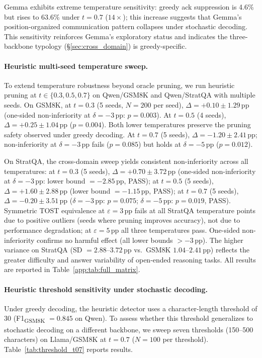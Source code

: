 Gemma exhibits extreme temperature sensitivity: greedy ack suppression is 4.6\% but rises to 63.6\% under $t{=}0.7$ ($14\times$); this increase suggests that Gemma's position-organized communication pattern collapses under stochastic decoding. This sensitivity reinforces Gemma's exploratory status and indicates the three-backbone typology (\S\ref{sec:cross_domain}) is greedy-specific.

\paragraph{Heuristic multi-seed temperature sweep.}
To extend temperature robustness beyond oracle pruning, we run heuristic pruning at $t \in \{0.3, 0.5, 0.7\}$ on Qwen/GSM8K and Qwen/StratQA with multiple seeds. On GSM8K, at $t{=}0.3$ (5 seeds, $N{=}200$ per seed), $\Delta = +0.10 \pm 1.29$\,pp (one-sided non-inferiority at $\delta = -3$\,pp: $p = 0.003$). At $t{=}0.5$ (4 seeds), $\Delta = +0.25 \pm 1.04$\,pp ($p = 0.004$). Both lower temperatures preserve the pruning safety observed under greedy decoding. At $t{=}0.7$ (5 seeds), $\Delta = -1.20 \pm 2.41$\,pp; non-inferiority at $\delta = -3$\,pp fails ($p = 0.085$) but holds at $\delta = -5$\,pp ($p = 0.012$).

On StratQA, the cross-domain sweep yields consistent non-inferiority across all temperatures: at $t{=}0.3$ (5 seeds), $\Delta = +0.70 \pm 3.72$\,pp (one-sided non-inferiority at $\delta = -3$\,pp: lower bound $= -2.85$\,pp, PASS); at $t{=}0.5$ (5 seeds), $\Delta = +1.60 \pm 2.88$\,pp (lower bound $= -1.15$\,pp, PASS); at $t{=}0.7$ (5 seeds), $\Delta = -0.20 \pm 3.51$\,pp ($\delta = -3$\,pp: $p = 0.075$; $\delta = -5$\,pp: $p = 0.019$, PASS). Symmetric TOST equivalence at $\varepsilon = 3$\,pp fails at all StratQA temperature points due to positive outliers (seeds where pruning improves accuracy), not due to performance degradation; at $\varepsilon = 5$\,pp all three temperatures pass. One-sided non-inferiority confirms no harmful effect (all lower bounds $> -3$\,pp). The higher variance on StratQA (SD $= 2.88$--$3.72$\,pp vs.\ GSM8K $1.04$--$2.41$\,pp) reflects the greater difficulty and answer variability of open-ended reasoning tasks. All results are reported in Table~\ref{app:tab:full_matrix}.

\paragraph{Heuristic threshold sensitivity under stochastic decoding.}
Under greedy decoding, the heuristic detector uses a character-length threshold of 30 (F1\textsubscript{GSM8K} $= 0.845$ on Qwen). To assess whether this threshold generalizes to stochastic decoding on a different backbone, we sweep seven thresholds (150--500 characters) on Llama/GSM8K at $t{=}0.7$ ($N{=}100$ per threshold). Table~\ref{tab:threshold_t07} reports results.

